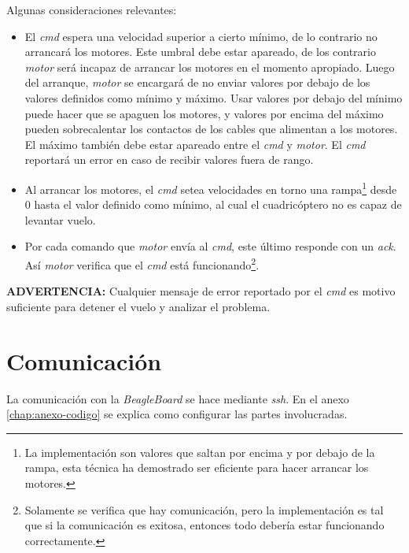 \documentclass[main]{subfiles}
\begin{document}
Algunas consideraciones relevantes:
\begin{itemize}
\item El \textit{cmd} espera una velocidad superior a cierto m\'inimo, de lo contrario no arrancar\'a los motores. Este umbral debe estar apareado, de los contrario \textit{motor} ser\'a incapaz de arrancar los motores en el momento apropiado.\newline
Luego del arranque, \textit{motor} se encargar\'a de no enviar valores por debajo de los valores definidos como m\'inimo y m\'aximo. Usar valores por debajo del m\'inimo puede hacer que se apaguen los motores, y valores por encima del m\'aximo pueden sobrecalentar los contactos de los cables que alimentan a los motores. El m\'aximo tambi\'en debe estar apareado entre el \textit{cmd} y \textit{motor}.\newline
El \textit{cmd} reportar\'a un error en caso de recibir valores fuera de rango.

\item Al arrancar los motores, el \textit{cmd} setea velocidades en torno una rampa\footnote{La implementaci\'on son valores que saltan por encima y por debajo de la rampa, esta t\'ecnica ha demostrado ser eficiente para hacer arrancar los motores.} desde 0 hasta el valor definido como m\'inimo, al cual el cuadric\'optero no es capaz de levantar vuelo.

\item Por cada comando que \textit{motor} env\'ia al \textit{cmd}, este \'ultimo responde con un \textit{ack}. Así \textit{motor} verifica que el \textit{cmd} est\'a funcionando\footnote{Solamente se verifica que hay comunicaci\'on, pero la implementaci\'on es tal que si la comunicaci\'on es exitosa, entonces todo deber\'ia estar funcionando correctamente.}.

\end{itemize}

\textbf{ADVERTENCIA:} Cualquier mensaje de error reportado por el \textit{cmd} es motivo suficiente para detener el vuelo y analizar el problema.

\section{Comunicaci\'on}
\label{sec:software-comm}

La comunicaci\'on con la \textit{BeagleBoard} se hace mediante \textit{ssh}. En el anexo \ref{chap:anexo-codigo} se explica como configurar las partes involucradas.
\end{document}
